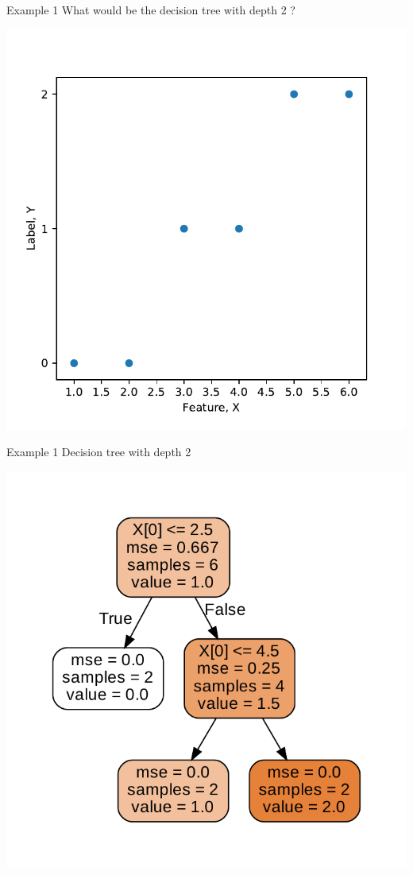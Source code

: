 \documentclass{beamer}
\begin{document}
\begin{frame}{Example 1}
What would be the decision tree with depth 2	?
\begin{center}
\includegraphics[scale=0.5]{decision-trees-regression/imgs/dataset}
\end{center}
\end{frame}

\begin{frame}{Example 1}
Decision tree with depth 2
\begin{center}
\includegraphics[scale=0.65]{decision-trees-regression/imgs/depth-2-decision-tree}	
\end{center}
\end{frame}
\end{document}
